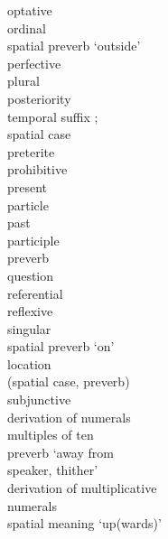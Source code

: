 \begin{multicols}{2}
\begin{tabbing}
				\>	{optative}\\
				\>	ordinal\\
				\>	spatial {preverb} `outside'\\
				\>	perfective\\
				\>	plural\\
				\>	posteriority \\
			{}		\>	    temporal suffix ;\\
			{}		\>	    {spatial case}  \\
				\>	preterite\\
				\>	{prohibitive}\\
				\>	present\\
				\>	{particle}\\
				\>	past\\
				\>	{participle}\\
				\>	{preverb}\\
					\>	question\\
				\>	referential\\
				\>	reflexive\\
				\>	singular\\
				\>	spatial {preverb} `on'\\
				\>	location \\
			{}		\>	({spatial case}, {preverb})\\
				\>	{subjunctive}\\
				\>	{derivation} of numerals \\ \> multiples of ten\\
				\>	{preverb} `away from \\ \> speaker, thither'\\
				\>	{derivation} of multiplicative \\ \> numerals\\
				\>	spatial meaning `up(wards)'
		\end{tabbing}
	\end{multicols}

